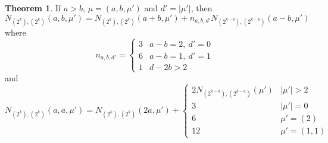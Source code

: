 \documentclass[thesis]{thesis-umich}           %
\theoremstyle{definition}
\newtheorem{thm}{Theorem}[section]
\begin{document}
\begin{thm}
  If $a>b$, $\mu=(a,b,\mu')$ and $d'=|\mu'|$, then
  \[
  N_{(2^k),(2^k)}(a,b,\mu')=N_{(2^k),(2^k)}(a+b,\mu')+n_{a,b,d'}N_{(2^{k-b}),(2^{k-b})}(a-b,\mu')
  \]
  where \[n_{a,b,d'}=\begin{cases}
  3 & a-b=2,\ d'=0 \\
  6 & a-b=1,\ d'=1 \\
  1 & d-2b>2 \end{cases}
  \]
  and
  \[
  N_{(2^k),(2^k)}(a,a,\mu')=
  N_{(2^k),(2^k)}(2a,\mu')+
  \begin{cases}
    2N_{(2^{k-a}),(2^{k-a})}(\mu') & |\mu'|>2 \\
    3 & |\mu'|=0 \\
    6 & \mu'=(2) \\
    12 & \mu'=(1,1)
    \end{cases}
  \]
  \end{thm}
\end{document}
